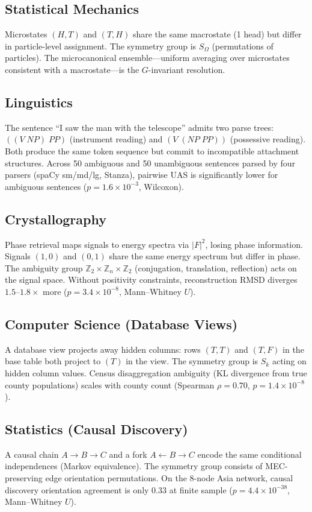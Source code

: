 \documentclass[11pt]{article}
\begin{document}
\subsection{Statistical Mechanics}
Microstates $(H,T)$ and $(T,H)$ share the same macrostate (1 head) but differ in particle-level assignment.  The symmetry group is $S_\Omega$ (permutations of particles).  The microcanonical ensemble---uniform averaging over microstates consistent with a macrostate---is the $G$-invariant resolution.

\subsection{Linguistics}
The sentence ``I saw the man with the telescope'' admits two parse trees: $((V\;NP)\;PP)$ (instrument reading) and $(V\;(NP\;PP))$ (possessive reading).  Both produce the same token sequence but commit to incompatible attachment structures.  Across 50 ambiguous and 50 unambiguous sentences parsed by four parsers (spaCy sm/md/lg, Stanza), pairwise UAS is significantly lower for ambiguous sentences ($p = 1.6 \times 10^{-3}$, Wilcoxon).

\subsection{Crystallography}
Phase retrieval maps signals to energy spectra via $|F|^2$, losing phase information.  Signals $(1,0)$ and $(0,1)$ share the same energy spectrum but differ in phase.  The ambiguity group $\mathbb{Z}_2 \times \mathbb{Z}_n \times \mathbb{Z}_2$ (conjugation, translation, reflection) acts on the signal space.  Without positivity constraints, reconstruction RMSD diverges $1.5$--$1.8\times$ more ($p = 3.4 \times 10^{-8}$, Mann--Whitney $U$).

\subsection{Computer Science (Database Views)}
A database view projects away hidden columns: rows $(T,T)$ and $(T,F)$ in the base table both project to $(T)$ in the view.  The symmetry group is $S_k$ acting on hidden column values.  Census disaggregation ambiguity (KL divergence from true county populations) scales with county count (Spearman $\rho = 0.70$, $p = 1.4 \times 10^{-8}$).

\subsection{Statistics (Causal Discovery)}
A causal chain $A \to B \to C$ and a fork $A \leftarrow B \to C$ encode the same conditional independences (Markov equivalence).  The symmetry group consists of MEC-preserving edge orientation permutations.  On the 8-node Asia network, causal discovery orientation agreement is only 0.33 at finite sample ($p = 4.4 \times 10^{-38}$, Mann--Whitney $U$).
\end{document}
